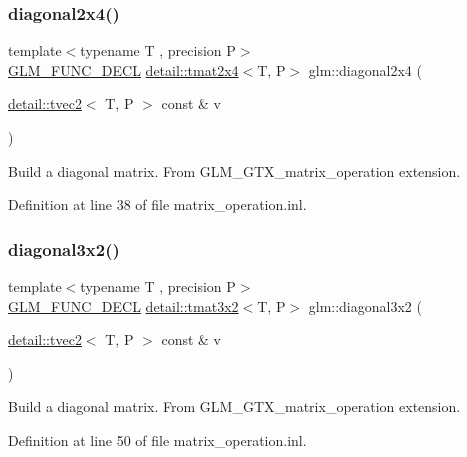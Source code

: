 \subsubsection{\texorpdfstring{diagonal2x4()}{diagonal2x4()}}
{\footnotesize\ttfamily template$<$typename T , precision P$>$ \\
\hyperlink{setup_8hpp_ab2d052de21a70539923e9bcbf6e83a51}{G\+L\+M\+\_\+\+F\+U\+N\+C\+\_\+\+D\+E\+CL} \hyperlink{structglm_1_1detail_1_1tmat2x4}{detail\+::tmat2x4}$<$T, P$>$ glm\+::diagonal2x4 (\begin{DoxyParamCaption}\item[{\hyperlink{structglm_1_1detail_1_1tvec2}{detail\+::tvec2}$<$ T, P $>$ const \&}]{v }\end{DoxyParamCaption})}

Build a diagonal matrix. From G\+L\+M\+\_\+\+G\+T\+X\+\_\+matrix\+\_\+operation extension. 

Definition at line 38 of file matrix\+\_\+operation.\+inl.

\mbox{\label{group__gtx__matrix__operation_gabf8e8445e2884aeaa35f0ec32ba5bd01}} 
\subsubsection{\texorpdfstring{diagonal3x2()}{diagonal3x2()}}
{\footnotesize\ttfamily template$<$typename T , precision P$>$ \\
\hyperlink{setup_8hpp_ab2d052de21a70539923e9bcbf6e83a51}{G\+L\+M\+\_\+\+F\+U\+N\+C\+\_\+\+D\+E\+CL} \hyperlink{structglm_1_1detail_1_1tmat3x2}{detail\+::tmat3x2}$<$T, P$>$ glm\+::diagonal3x2 (\begin{DoxyParamCaption}\item[{\hyperlink{structglm_1_1detail_1_1tvec2}{detail\+::tvec2}$<$ T, P $>$ const \&}]{v }\end{DoxyParamCaption})}

Build a diagonal matrix. From G\+L\+M\+\_\+\+G\+T\+X\+\_\+matrix\+\_\+operation extension. 

Definition at line 50 of file matrix\+\_\+operation.\+inl.

\mbox{\label{group__gtx__matrix__operation_gaa49be0f424ad2f3015c5945c13a5fad0}} 
